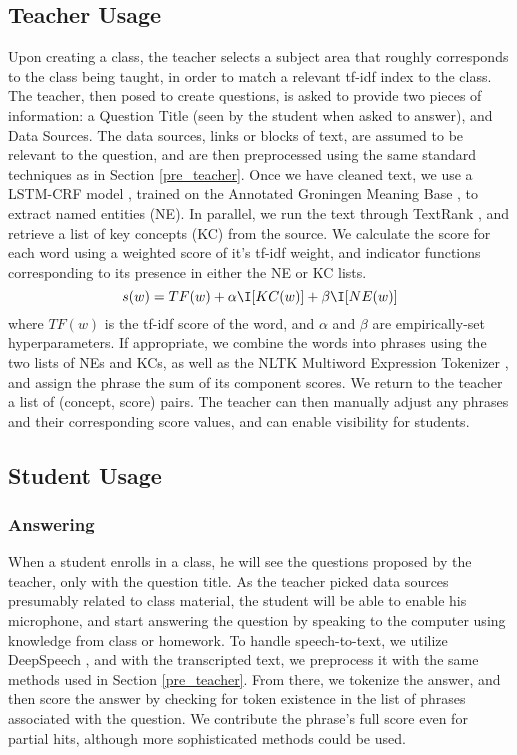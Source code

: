 \documentclass[11pt,a4paper]{article}
\begin{document}
\subsection{Teacher Usage}\label{teacher}
Upon creating a class, the teacher selects a subject area that roughly corresponds to the class being taught, in order to match a relevant tf-idf index to the class. The teacher, then posed to create questions, is asked to provide two pieces of information: a Question Title (seen by the student when asked to answer), and Data Sources. The data sources, links or blocks of text, are assumed to be relevant to the question, and are then preprocessed using the same standard techniques as in Section \ref{pre_teacher}. Once we have cleaned text, we use a LSTM-CRF model \cite{TODO}, trained on the Annotated Groningen Meaning Base \cite{TODO}, to extract named entities (NE). In parallel, we run the text through TextRank \cite{TODO} \cite{TODO Barrios}, and retrieve a list of key concepts (KC) from the source. We calculate the score for each word using a weighted score of it's tf-idf weight, and indicator functions corresponding to its presence in either the NE or KC lists.
\begin{equation}
    s(w) = TF(w) + \alpha \I[KC(w)] + \beta \I[NE(w)]
\end{equation}
where $TF(w)$ is the tf-idf score of the word, and $\alpha$ and $\beta$ are empirically-set hyperparameters. If appropriate, we combine the words into phrases using the two lists of NEs and KCs, as well as the NLTK Multiword Expression Tokenizer \cite{TODO}, and assign the phrase the sum of its component scores. We return to the teacher a list of (concept, score) pairs. The teacher can then manually adjust any phrases and their corresponding score values, and can enable visibility for students.
\subsection{Student Usage}
\subsubsection{Answering}
When a student enrolls in a class, he will see the questions proposed by the teacher, only with the question title. As the teacher picked data sources presumably related to class material, the student will be able to enable his microphone, and start answering the question by speaking to the computer using knowledge from class or homework. To handle speech-to-text, we utilize DeepSpeech \cite{TODO}, and with the transcripted text, we preprocess it with the same methods used in Section \ref{pre_teacher}. From there, we tokenize the answer, and then score the answer by checking for token existence in the list of phrases associated with the question. We contribute the phrase's full score even for partial hits, although more sophisticated methods could be used.
\end{document}
